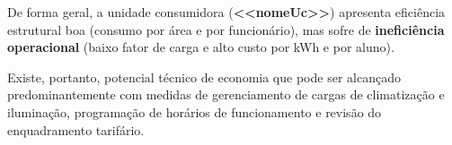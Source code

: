 De forma geral, a unidade consumidora (\textbf{<<nomeUc>>}) apresenta eficiência estrutural boa (consumo por área e por funcionário), mas sofre de \textbf{ineficiência operacional} (baixo fator de carga e alto custo por kWh e por aluno).

Existe, portanto, potencial técnico de economia que pode ser alcançado predominantemente com medidas de gerenciamento de cargas de climatização e iluminação, programação de horários de funcionamento e revisão do enquadramento tarifário.


